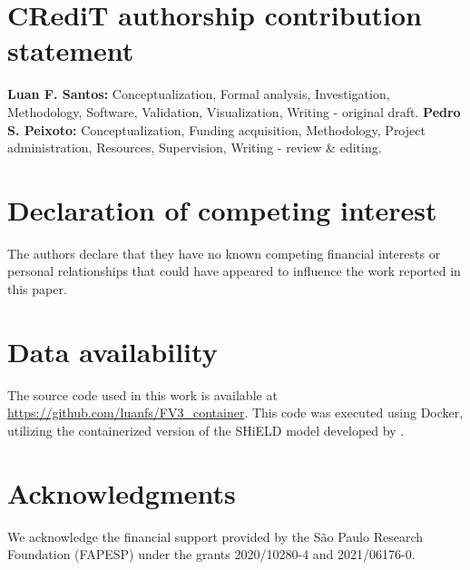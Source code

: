 \documentclass[preprint,12pt]{elsarticle}
\begin{document}
\begin{linenumbers}
\section*{CRediT authorship contribution statement}
\textbf{Luan F. Santos:} Conceptualization, Formal analysis, Investigation, Methodology, Software, Validation, Visualization, Writing - original draft.
\textbf{Pedro S. Peixoto:} Conceptualization, Funding acquisition, Methodology, Project administration, Resources, Supervision, Writing - review \& editing.

\section*{Declaration of competing interest}
The authors declare that they have no known competing financial interests or personal relationships that could have appeared to influence the work reported in this paper.

\section*{Data availability}
The source code used in this work is available at \url{https://github.com/luanfs/FV3_container}.
This code was executed using Docker, utilizing the containerized
version of the SHiELD model developed by \cite{cheng:2022}.

\section*{Acknowledgments}
We acknowledge the financial support provided by the São Paulo Research Foundation (FAPESP) under the grants 2020/10280-4 and 2021/06176-0.



\appendix

\end{linenumbers}
\end{document}
